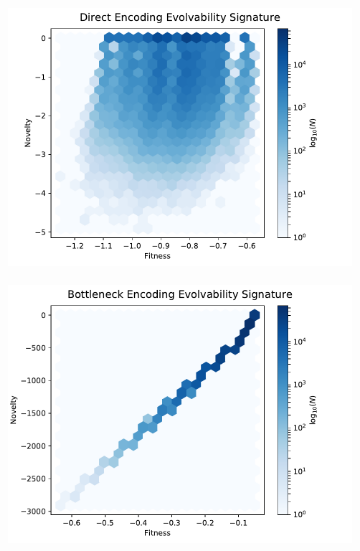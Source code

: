 \begin{figure}
        \begin{subfigure}[b]{0.33\linewidth}
                \includegraphics[width=\linewidth]{img/direct_es_unscaled}
        \end{subfigure}%
        \begin{subfigure}[b]{0.33\linewidth}
                \includegraphics[width=\linewidth]{img/bottleneck_es_unscaled}
        \end{subfigure}%
        \begin{subfigure}[b]{0.33\linewidth}

\end{subfigure}
\end{figure}
